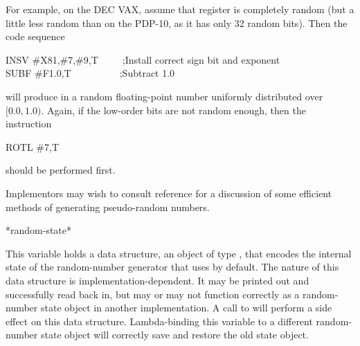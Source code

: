 \begin{defun}[Function]
\begin{implementation}
For example, on the DEC VAX, assume that register  is
completely random (but a little less random than on the PDP-10, as
it has only 32 random bits).  Then the code sequence
\begin{lisp}
INSV \#{\Xcircumflex}X81,\#7,\#9,T~~~~~;\textrm{Install correct sign bit and exponent} \\
SUBF \#{\Xcircumflex}F1.0,T~~~~~~~~~~;\textrm{Subtract 1.0}
\end{lisp}
will produce in  a random floating-point number uniformly distributed
over $[0.0, 1.0)$.  Again, if the low-order bits are not random enough,
then the instruction
\begin{lisp}
ROTL \#7,T
\end{lisp}
should be performed first.

Implementors may wish to consult reference \cite{ADDITIVE-RANDOMS} for
a discussion of some efficient methods of generating pseudo-random numbers.
\end{implementation}
\afternoterule
\end{defun}

\begin{defun}[Variable]
*random-state*

This variable holds a data structure,
an object of type , that encodes the internal state
of the random-number generator that  uses by default.
The nature
of this data structure is implementation-dependent.  It may be
printed out and successfully read back in, but may or may not function
correctly as a random-number state object in another implementation.
A call to  will perform a side effect on this data structure.
Lambda-binding this variable to a different random-number state object
will correctly save and restore the old state object.
\end{defun}

